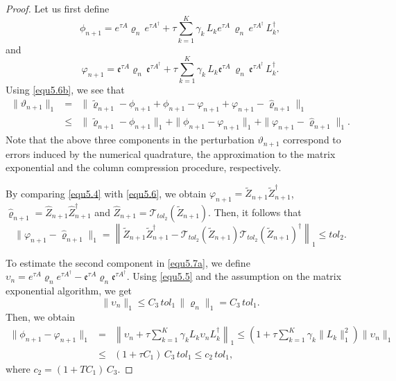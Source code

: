 \documentclass[preprint,3p,compress,12pt]{elsarticle}
\numberwithin{equation}{section}
\numberwithin{figure}{section}
\begin{document}
\begin{proof}
  Let us first define
  \begin{equation*}
    \phi_{n+1}=e^{\tau A} \varrho_n \, e^{\tau A^{\dag}}+\tau\sum_{k=1}^K\gamma_k \, L_k e^{\tau A}  \,  \varrho_n \, e^{\tau A^{\dag}} \, L_k^{\dag},
  \end{equation*}
  and
  \begin{equation*}
    \varphi_{n+1}=\mathfrak{e}^{\tau A} \varrho_n \, \mathfrak{e}^{\tau A^{\dag}}+\tau\sum_{k=1}^K\gamma_k \, L_k \mathfrak{e}^{\tau A} \, \varrho_n \, \mathfrak{e}^{\tau A^{\dag}} \, L_k^{\dag}.
  \end{equation*}
  Using \eqref{equ5.6b}, we see that
  \begin{eqnarray}\label{equ5.7a}
    \|\vartheta_{n+1}\|_1&=&\|\tilde{\varrho}_{n+1}-\phi_{n+1}+\phi_{n+1}-\varphi_{n+1}+
    \varphi_{n+1}-\hat{\varrho}_{n+1}\|_1 \nonumber \\
    &\leq&\|\tilde{\varrho}_{n+1}-\phi_{n+1}\|_1
    +\|\phi_{n+1}-\varphi_{n+1}\|_1+\|\varphi_{n+1}-\hat{\varrho}_{n+1}\|_1.
  \end{eqnarray}
  Note that the above three components in the perturbation $\vartheta_{n+1}$ correspond to
  errors induced by the numerical quadrature, the approximation to the matrix exponential and the column compression procedure, respectively.

  By comparing \eqref{equ5.4} with \eqref{equ5.6}, we obtain $\varphi_{n+1}=\tilde{Z}_{n+1}\tilde{Z}_{n+1}^{\dag}$, $\hat{\varrho}_{n+1}=\hat{Z}_{n+1}\hat{Z}_{n+1}^{\dag}$ and
  $\hat{Z}_{n+1}= \mathcal{T}_{tol_2}(\tilde{Z}_{n+1})$. Then, it follows that
  \begin{equation}\label{equ5.7b}
    \|\varphi_{n+1}-\hat{\varrho}_{n+1}\|_1=
    \left\|\tilde{Z}_{n+1}\tilde{Z}_{n+1}^{\dag}-\mathcal{T}_{tol_2}(\tilde{Z}_{n+1})
    \mathcal{T}_{tol_2}(\tilde{Z}_{n+1})^{\dag}\right\|_1\leq tol_2.
  \end{equation}

To estimate the second component in \eqref{equ5.7a}, we define $\upsilon_n=e^{\tau A}\varrho_ne^{\tau A^{\dag}}-\mathfrak{e}^{\tau A}\varrho_n\mathfrak{e}^{\tau A^{\dag}}$.
Using \eqref{equ5.5} and the assumption on the matrix exponential algorithm, we get
\[\|\upsilon_n\|_1\leq C_3\, tol_1\, \|\varrho_n\|_1=C_3\,  tol_1.\]
Then, we obtain
\begin{eqnarray}\label{equ5.7c}
  \|\phi_{n+1}-\varphi_{n+1}\|_1&=& \left\|\upsilon_n+\tau\sum_{k=1}^K\gamma_kL_k\upsilon_nL_k^{\dag}\right\|_1
  \leq \left(1+\tau\sum_{k=1}^K\gamma_k\|L_k\|_1^2\right)\|\upsilon_n\|_1\nonumber\\
  &\leq&(1+\tau C_1) \, C_3\, tol_1\leq c_2\, tol_1,
\end{eqnarray}
where $c_2=(1+TC_1) \, C_3$.


\end{proof}
\end{document}
